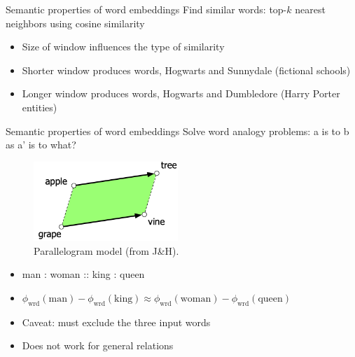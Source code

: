 \documentclass[usenames,dvipsnames,notes,11pt,aspectratio=169]{beamer}
\newcommand{\pdfnote}[1]{}
\begin{document}
\begin{frame}
    {Semantic properties of word embeddings}
        Find similar words: top-$k$ nearest neighbors using cosine similarity
            \begin{itemize}
                \item Size of window influences the type of similarity
                \item Shorter window produces  words, \eg Hogwarts and Sunnydale (fictional schools)
                \item Longer window produces  words, \eg Hogwarts and Dumbledore (Harry Porter entities)
            \end{itemize}
\end{frame}

\begin{frame}
    {Semantic properties of word embeddings}
        Solve word analogy problems: a is to b as a' is to what?
        \vspace{-1em}
        \begin{figure}
            \includegraphics[height=3cm]{figures/analogy}
            \caption{Parallelogram model (from J\&H).}
        \end{figure}
        \vspace{-1em}
            \begin{itemize}
                \item man : woman :: king : queen
                \item[] $\phi_{\text{wrd}}(\text{man}) - \phi_{\text{wrd}}(\text{king}) \approx \phi_{\text{wrd}}(\text{woman}) - \phi_{\text{wrd}}(\text{queen})$
                \item Caveat: must exclude the three input words
                \item Does not work for general relations
            \end{itemize}
            \pdfnote{
                While embedding spaces perform well if the task involves frequent words, small distances, and certain relations (like relating countries with their capitals or verbs/nouns with their inflected forms), the parallelogram method with embeddings doesn’t work as well for other relations
            }
\end{frame}
\end{document}
